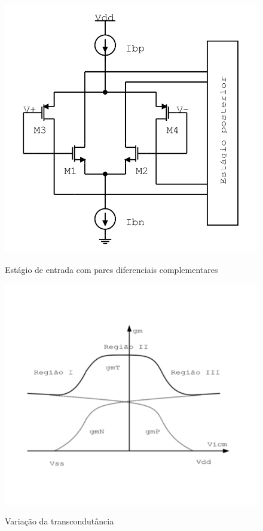 \documentclass[
	12pt,				%
	oneside,			%
	a4paper,			%
	english,			%
	french,				%
	spanish,			%
	brazil				%
	]{abntex2}
\begin{document}
\begin{figure}[H]
\centering
\begin{minipage}{.4\textwidth}
  \centering
  \includegraphics[width=.8\linewidth]{pares-paralelos.png}
  \caption{Estágio de entrada com pares diferenciais complementares}
  \label{pares-paralelos}
\end{minipage}%
\begin{minipage}{.6\textwidth}
  \centering
  \includegraphics[width=.8\linewidth]{transconductanceRails.PNG}
  \caption{Variação da transcondutância}
  \label{transconductanceRails}
\end{minipage}
\end{figure}
\end{document}
